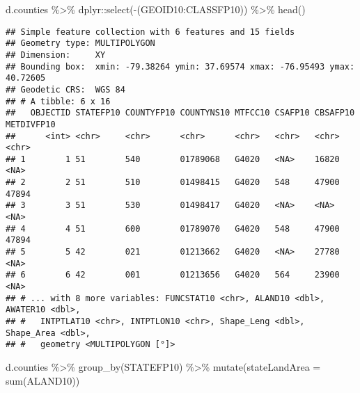 \documentclass[
]{article}
\newenvironment{Shaded}{\begin{snugshade}}{\end{snugshade}}
\newcommand{\AttributeTok}[1]{\textcolor[rgb]{0.77,0.63,0.00}{#1}}
\newcommand{\FunctionTok}[1]{\textcolor[rgb]{0.00,0.00,0.00}{#1}}
\newcommand{\NormalTok}[1]{#1}
\newcommand{\SpecialCharTok}[1]{\textcolor[rgb]{0.00,0.00,0.00}{#1}}
\begin{document}
\begin{Shaded}
\begin{Highlighting}[]
\NormalTok{d.counties }\SpecialCharTok{\%\textgreater{}\%}\NormalTok{ dplyr}\SpecialCharTok{::}\FunctionTok{select}\NormalTok{(}\SpecialCharTok{{-}}\NormalTok{(GEOID10}\SpecialCharTok{:}\NormalTok{CLASSFP10)) }\SpecialCharTok{\%\textgreater{}\%} \FunctionTok{head}\NormalTok{()}
\end{Highlighting}
\end{Shaded}

\begin{verbatim}
## Simple feature collection with 6 features and 15 fields
## Geometry type: MULTIPOLYGON
## Dimension:     XY
## Bounding box:  xmin: -79.38264 ymin: 37.69574 xmax: -76.95493 ymax: 40.72605
## Geodetic CRS:  WGS 84
## # A tibble: 6 x 16
##   OBJECTID STATEFP10 COUNTYFP10 COUNTYNS10 MTFCC10 CSAFP10 CBSAFP10 METDIVFP10
##      <int> <chr>     <chr>      <chr>      <chr>   <chr>   <chr>    <chr>     
## 1        1 51        540        01789068   G4020   <NA>    16820    <NA>      
## 2        2 51        510        01498415   G4020   548     47900    47894     
## 3        3 51        530        01498417   G4020   <NA>    <NA>     <NA>      
## 4        4 51        600        01789070   G4020   548     47900    47894     
## 5        5 42        021        01213662   G4020   <NA>    27780    <NA>      
## 6        6 42        001        01213656   G4020   564     23900    <NA>      
## # ... with 8 more variables: FUNCSTAT10 <chr>, ALAND10 <dbl>, AWATER10 <dbl>,
## #   INTPTLAT10 <chr>, INTPTLON10 <chr>, Shape_Leng <dbl>, Shape_Area <dbl>,
## #   geometry <MULTIPOLYGON [°]>
\end{verbatim}

\begin{Shaded}
\begin{Highlighting}[]
\NormalTok{d.counties }\SpecialCharTok{\%\textgreater{}\%} \FunctionTok{group\_by}\NormalTok{(STATEFP10) }\SpecialCharTok{\%\textgreater{}\%} \FunctionTok{mutate}\NormalTok{(}\AttributeTok{stateLandArea =} \FunctionTok{sum}\NormalTok{(ALAND10))}
\end{Highlighting}
\end{Shaded}
\end{document}
